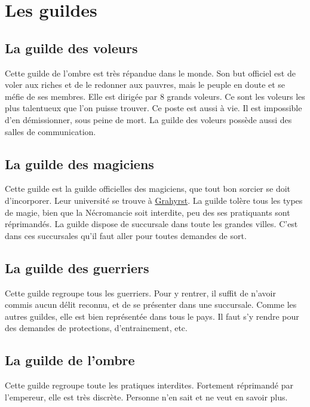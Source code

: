
\section{Les guildes}
\subsection{La guilde des voleurs}
\hypertarget{laguildedesvoleurs}{}Cette guilde de l'ombre est très répandue dans le monde.
Son but officiel est de voler aux riches et de le redonner aux pauvres, mais le peuple en doute et se méfie de ses membres.
Elle est dirigée par 8 grands voleurs. Ce sont les voleurs les plus talentueux que l'on puisse trouver.
Ce poste est aussi à vie. Il est impossible d'en démissionner, sous peine de mort.
La guilde des voleurs possède aussi des salles de communication.
\subsection{La guilde des magiciens}
\hypertarget {laguildedesmagiciens}{}Cette guilde est la guilde officielles des magiciens, que tout bon sorcier se doit d’incorporer.
Leur université se trouve à \hyperlink {grahyrst} {Grahyrst}.
La guilde tolère tous les types de magie, bien que la Nécromancie soit interdite, peu des ses pratiquants sont réprimandés.
La guilde dispose de succursale dans toute les grandes villes.
C'est dans ces succursales qu'il faut aller pour toutes demandes de sort.
\subsection{La guilde des guerriers}
\hypertarget {laguildedesguerriers}{}Cette guilde regroupe tous les guerriers.
Pour y rentrer, il suffit de n'avoir commis aucun délit reconnu, et de se présenter dans une succursale.
Comme les autres guildes, elle est bien représentée dans tous le pays.
Il faut s'y rendre pour des demandes de protections, d'entrainement, etc.
\subsection{La guilde de l'ombre}
\hypertarget{laguildedelombre}{}Cette guilde regroupe toute les pratiques interdites.
Fortement réprimandé par l'empereur, elle est très discrète.
Personne n'en sait et ne veut en savoir plus.
